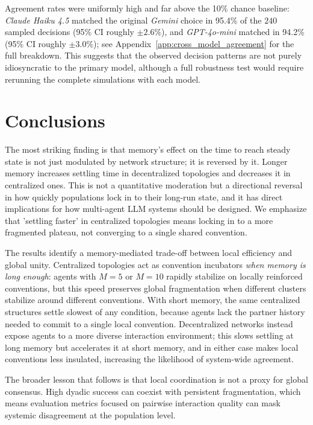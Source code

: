 \documentclass{article}
\begin{document}
Agreement rates were uniformly high and far above the 10\% chance baseline: \textit{Claude Haiku 4.5} matched the original \textit{Gemini} choice in 95.4\% of the $240$ sampled decisions (95\% CI roughly $\pm 2.6\%$), and \textit{GPT-4o-mini} matched in 94.2\% (95\% CI roughly $\pm 3.0\%$); see Appendix~\ref{app:cross_model_agreement} for the full breakdown. This suggests that the observed decision patterns are not purely idiosyncratic to the primary model, although a full robustness test would require rerunning the complete simulations with each model.

\section{Conclusions}
\label{sec:conclusion}

The most striking finding is that memory's effect on the time to reach steady state is not just modulated by network structure; it is reversed by it. Longer memory increases settling time in decentralized topologies and decreases it in centralized ones. This is not a quantitative moderation but a directional reversal in how quickly populations lock in to their long-run state, and it has direct implications for how multi-agent LLM systems should be designed. We emphasize that 'settling faster' in centralized topologies means locking in to a more fragmented plateau, not converging to a single shared convention.

The results identify a memory-mediated trade-off between local efficiency and global unity. Centralized topologies act as convention incubators \emph{when memory is long enough}: agents with $M=5$ or $M=10$ rapidly stabilize on locally reinforced conventions, but this speed preserves global fragmentation when different clusters stabilize around different conventions. With short memory, the same centralized structures settle slowest of any condition, because agents lack the partner history needed to commit to a single local convention. Decentralized networks instead expose agents to a more diverse interaction environment; this slows settling at long memory but accelerates it at short memory, and in either case makes local conventions less insulated, increasing the likelihood of system-wide agreement.

The broader lesson that follows is that local coordination is not a proxy for global consensus. High dyadic success can coexist with persistent fragmentation, which means evaluation metrics focused on pairwise interaction quality can mask systemic disagreement at the population level.
\end{document}
